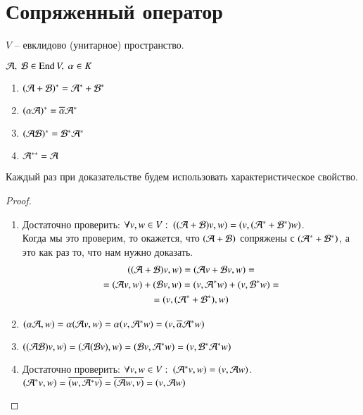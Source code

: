 \documentclass[main]{subfiles}
\begin{document}
\chapter{Сопряженный оператор}

$V$ -- евклидово (унитарное) пространство.

\begin{proposition}
    $\mathcal{A}, \ \mathcal{B} \in \operatorname{End} V, \ \alpha \in K$
    \begin{enumerate}
        \item $(\mathcal{A} + \mathcal{B})^* = \mathcal{A}^* + \mathcal{B}^*$
        \item $(\alpha \mathcal{A})^* = \overline{\alpha} \mathcal{A}^*$
        \item $(\mathcal{A} \mathcal{B})^* = \mathcal{B}^* \mathcal{A}^*$
        \item $\mathcal{A}^{**} = \mathcal{A}$
    \end{enumerate}
\end{proposition}

Каждый раз при доказательстве будем использовать характеристическое свойство.

\begin{proof}
    \begin{enumerate}
        \item Достаточно проверить: $\forall v, w \in V: \ ((\mathcal{A} + \mathcal{B})v, w) = (v, (\mathcal{A}^* + \mathcal{B}^*) w)$. \\
              Когда мы это проверим, то окажется, что $(\mathcal{A} + \mathcal{B})$ сопряжены с $(\mathcal{A}^* + \mathcal{B}^*)$, а это как раз то, что нам нужно доказать.
              \begin{multline*}
                  ((\mathcal{A} + \mathcal{B})v, w) = (\mathcal{A} v + \mathcal{B} v, w) = \\
                  = (\mathcal{A} v, w) + (\mathcal{B} v, w) = (v, \mathcal{A}^* w) + (v, \mathcal{B}^* w) = \\
                  = (v, (\mathcal{A}^* + \mathcal{B}^*), w)
              \end{multline*}
        \item

              $(\alpha \mathcal{A}, w) = \alpha(\mathcal{A} v, w) = \alpha(v, \mathcal{A}^* w) = (v, \overline{\alpha} \mathcal{A}^* w)$

        \item  $((\mathcal{A} \mathcal{B})v, w)= (\mathcal{A}(\mathcal{B} v), w) = (\mathcal{B} v, \mathcal{A}^* w) = (v, \mathcal{B}^* \mathcal{A}^* w) $
        \item Достаточно проверить: $\forall v, w \in V: \ (\mathcal{A}^* v, w) = (v,\mathcal{A} w)$. \\
              $(\mathcal{A}^* v, w) = \overline{(w, \mathcal{A}^* v)} = \overline{(\mathcal{A} w, v)} = (v, \mathcal{A} w) $
    \end{enumerate}
\end{proof}
\end{document}
